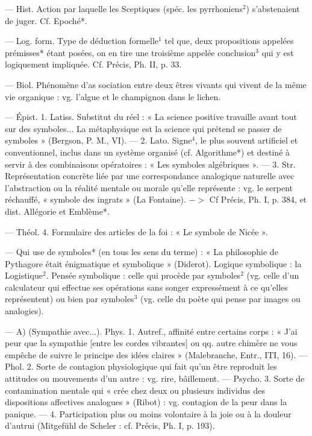 \begin{itemize}[leftmargin=1cm, label=, itemsep=1pt]
 — Hist.
Action par laquelle les Sceptiques
(spéc. les pyrrhoniens$^2$) s’abstenaient de juger. Cf. Epoché*.

 — Log. form. Type de
déduction formelle$^1$ tel que, deux
propositions appelées prémisses*
étant posées, on en tire une troisième appelée conclusion$^3$ qui y est
logiquement impliquée. Cf. Précis,
Ph. II, p. 33.

 — Biol. Phénomène d’as
sociation entre deux êtres vivants
qui vivent de la même vie organique :
vg. l’algue et le champignon dans
le lichen.

 — Épist. 1. Latiss. Substitut
du réel : « La science positive travaille avant tout sur des symboles...
La métaphysique est la science qui
prétend se passer de symboles »
(Bergson, P. M., VI). — 2. Lato.
Signe$^4$, le plus souvent artificiel et
conventionnel, inclus dans un système organisé (cf. Algorithme*) et
destiné à servir à des combinaisons
opératoires : « Les symboles algébriques ». — 3. Str. Représentation
concrète liée par une correspondance analogique naturelle avec
l’abstraction ou la réalité mentale
ou morale qu’elle représente : vg. le
serpent réchauffé, « symbole des
ingrats » (La Fontaine). $->$ Cf
Précis, Ph. I, p. 384, et dist. Allégorie et Emblème*.

— Théol. 4. Formulaire des articles de la foi : « Le symbole de
Nicée ».

 — Qui use de symboles*
(en tous les sens du terme) : « La
philosophie de Pythagore était énigmatique et symbolique » (Diderot).
Logique symbolique : la Logistique$^2$.
Pensée symbolique : celle qui procède
par symboles$^2$ (vg. celle d’un calculateur
qui effectue ses opérations
sans songer expressément à ce
qu’elles représentent) ou bien par
symboles$^3$ (vg. celle du poète qui
pense par images ou analogies).

 — A) (Sympathie avec...).
Phys. 1. Autref., affinité entre certains corps : « J'ai peur que la sympathie [entre les cordes vibrantes]
ou qq. autre chimère ne vous empêche de suivre le principe des idées
claires » (Malebranche, Entr., ITI,
16). — Phol. 2. Sorte de contagion
physiologique qui fait qu'un être
reproduit les attitudes ou mouvements d’un autre : vg. rire, bâillement. — Psycho. 3. Sorte de contamination mentale qui « crée chez
deux ou plusieurs individus des
dispositions affectives analogues »
(Ribot) : vg. contagion de la peur
dans la panique. — 4. Participation
plus ou moins volontaire à la joie ou
à la douleur d'autrui (Mitgefühl de
Scheler : cf. Précis, Ph. I, p. 193).


\end{itemize}
